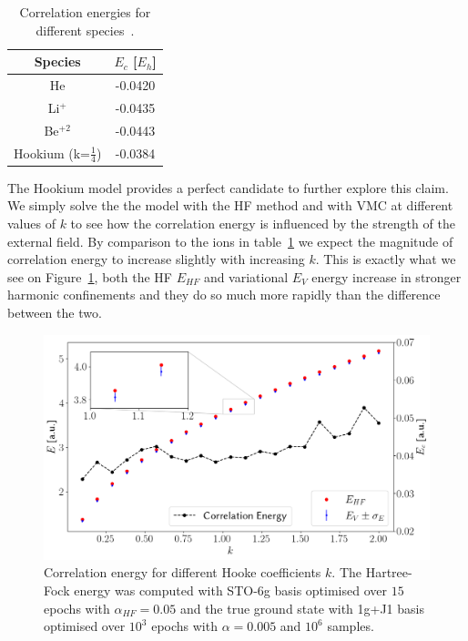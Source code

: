 \documentclass[final,3p,times,twocolumn]{elsarticle}
\begin{document}
	\begin{table}[h]
		\centering
		\begin{tabular}{@{}cc@{}} 
			\toprule
			Species &  $E_c $ [$E_h$] \\ \midrule
			He			& -0.0420 \\
			Li$^+$		& -0.0435 \\
			Be$^{+2}$	& -0.0443 \\
			Hookium	(k=$\frac{1}{4}$)	& -0.0384 \\
			\bottomrule
		\end{tabular}
		\caption{\label{tab:corrs} Correlation energies for different species~\cite{kais1993density}.}
	\end{table}
	The Hookium model provides a perfect candidate to further explore this claim. We simply solve the the model with the HF method and with VMC at different values of $k$ to see how the correlation energy is influenced by the strength of the external field. By comparison to the ions in table~\ref{tab:corrs} we expect the magnitude of correlation energy to increase slightly with increasing $k$. This is exactly what we see on Figure~\ref{fig:correng}, both the HF $E_{HF}$ and variational $E_V$ energy increase in stronger harmonic confinements and they do so much more rapidly than the difference between the two.
	\begin{figure}[h]
	\centering
	\includegraphics[width=\linewidth]{../plots/corrPlot.png}
	\caption{Correlation energy for different Hooke coefficients $k$. The Hartree-Fock energy was computed with STO-6g basis optimised over $15$ epochs with $\alpha_{HF} = 0.05$ and the true ground state with 1g+J1 basis optimised over $10^3$ epochs with $\alpha=0.005$ and $10^6$ samples.}
	\label{fig:correng}
	\end{figure}
\end{document}
